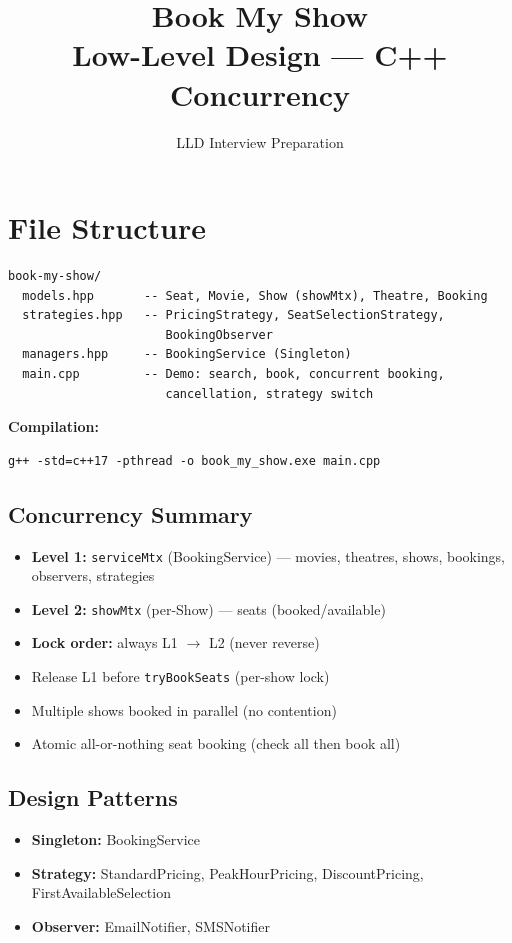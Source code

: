 \documentclass[11pt,a4paper]{article}
\title{\Huge\textbf{Book My Show}\\[0.3em]\Large Low-Level Design --- C++ Concurrency}
\author{LLD Interview Preparation}
\date{}
\begin{document}
\maketitle
\tableofcontents
\newpage

\section{File Structure}
\begin{verbatim}
book-my-show/
  models.hpp       -- Seat, Movie, Show (showMtx), Theatre, Booking
  strategies.hpp   -- PricingStrategy, SeatSelectionStrategy,
                      BookingObserver
  managers.hpp     -- BookingService (Singleton)
  main.cpp         -- Demo: search, book, concurrent booking,
                      cancellation, strategy switch
\end{verbatim}

\textbf{Compilation:}
\begin{verbatim}
g++ -std=c++17 -pthread -o book_my_show.exe main.cpp
\end{verbatim}

\subsection{Concurrency Summary}
\begin{itemize}
    \item \textbf{Level 1:} \texttt{serviceMtx} (BookingService) --- movies, theatres, shows, bookings, observers, strategies
    \item \textbf{Level 2:} \texttt{showMtx} (per-Show) --- seats (booked/available)
    \item \textbf{Lock order:} always L1 $\rightarrow$ L2 (never reverse)
    \item Release L1 before \texttt{tryBookSeats} (per-show lock)
    \item Multiple shows booked in parallel (no contention)
    \item Atomic all-or-nothing seat booking (check all then book all)
\end{itemize}

\subsection{Design Patterns}
\begin{itemize}
    \item \textbf{Singleton:} BookingService
    \item \textbf{Strategy:} StandardPricing, PeakHourPricing, DiscountPricing, FirstAvailableSelection
    \item \textbf{Observer:} EmailNotifier, SMSNotifier
\end{itemize}
\end{document}
